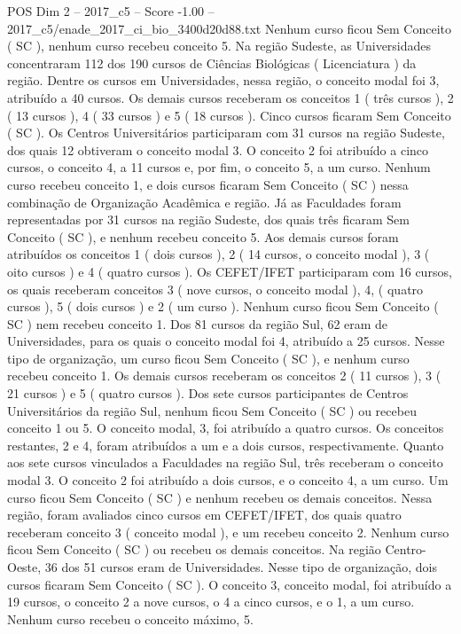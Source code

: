 \begin{textsample}{POS Dim 2 – 2017\_c5 – Score -1.00 – 2017\_c5/enade\_2017\_ci\_bio\_3400d20d88.txt}
Nenhum curso ficou Sem Conceito ( SC ), nenhum curso recebeu conceito 5.
Na região Sudeste, as Universidades concentraram 112 dos 190 cursos de Ciências Biológicas ( Licenciatura ) da região.
Dentre os cursos em Universidades, nessa região, o conceito modal foi 3, atribuído a 40 cursos.
Os demais cursos receberam os conceitos 1 ( três cursos ), 2 ( 13 cursos ), 4 ( 33 cursos ) e 5 ( 18 cursos ).
Cinco cursos ficaram Sem Conceito ( SC ).
Os Centros Universitários participaram com 31 cursos na região Sudeste, dos quais 12 obtiveram o conceito modal 3.
O conceito 2 foi atribuído a cinco cursos, o conceito 4, a 11 cursos e, por fim, o conceito 5, a um curso.
Nenhum curso recebeu conceito 1, e dois cursos ficaram Sem Conceito ( SC ) nessa combinação de Organização Acadêmica e região.
Já as Faculdades foram representadas por 31 cursos na região Sudeste, dos quais três ficaram Sem Conceito ( SC ), e nenhum recebeu conceito 5.
Aos demais cursos foram atribuídos os conceitos 1 ( dois cursos ), 2 ( 14 cursos, o conceito modal ), 3 ( oito cursos ) e 4 ( quatro cursos ).
Os CEFET/IFET participaram com 16 cursos, os quais receberam conceitos 3 ( nove cursos, o conceito modal ), 4, ( quatro cursos ), 5 ( dois cursos ) e 2 ( um curso ).
Nenhum curso ficou Sem Conceito ( SC ) nem recebeu conceito 1.
Dos 81 cursos da região Sul, 62 eram de Universidades, para os quais o conceito modal foi 4, atribuído a 25 cursos.
Nesse tipo de organização, um curso ficou Sem Conceito ( SC ), e nenhum curso recebeu conceito 1.
Os demais cursos receberam os conceitos 2 ( 11 cursos ), 3 ( 21 cursos ) e 5 ( quatro cursos ).
Dos sete cursos participantes de Centros Universitários da região Sul, nenhum ficou Sem Conceito ( SC ) ou recebeu conceito 1 ou 5.
O conceito modal, 3, foi atribuído a quatro cursos.
Os conceitos restantes, 2 e 4, foram atribuídos a um e a dois cursos, respectivamente.
Quanto aos sete cursos vinculados a Faculdades na região Sul, três receberam o conceito modal 3.
O conceito 2 foi atribuído a dois cursos, e o conceito 4, a um curso.
Um curso ficou Sem Conceito ( SC ) e nenhum recebeu os demais conceitos.
Nessa região, foram avaliados cinco cursos em CEFET/IFET, dos quais quatro receberam conceito 3 ( conceito modal ), e um recebeu conceito 2.
Nenhum curso ficou Sem Conceito ( SC ) ou recebeu os demais conceitos.
Na região Centro-Oeste, 36 dos 51 cursos eram de Universidades.
Nesse tipo de organização, dois cursos ficaram Sem Conceito ( SC ).
O conceito 3, conceito modal, foi atribuído a 19 cursos, o conceito 2 a nove cursos, o 4 a cinco cursos, e o 1, a um curso.
Nenhum curso recebeu o conceito máximo, 5.

\end{textsample}
